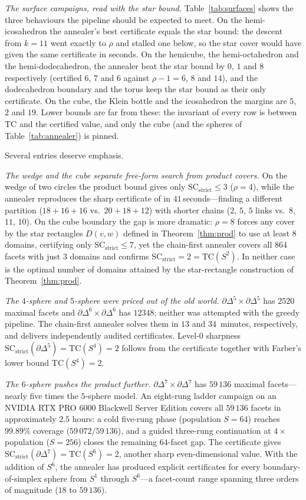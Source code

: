 \documentclass[12pt]{article}
\newcommand{\TC}{\mathrm{TC}}
\newcommand{\SC}{\mathrm{SC}}
\newcommand{\SCst}{\SC_{\mathrm{strict}}}
\begin{document}
\emph{The surface campaigns, read with the star bound.}  Table~\ref{tab:surfaces}
shows the three behaviours the pipeline should be expected to meet.  On
the hemi-icosahedron the annealer's best certificate equals the star
bound: the descent from $k=11$ went exactly to $\rho$ and stalled one
below, so the star cover would have given the same certificate in
seconds.  On the hemicube, the hemi-octahedron and the
hemi-dodecahedron, the annealer beat the star bound by $0$, $1$ and $8$
respectively (certified $6$, $7$ and $6$ against $\rho-1=6$, $8$ and
$14$), and the dodecahedron boundary and the torus keep the star bound as
their only certificate.  On the cube, the Klein bottle and the
icosahedron the margins are $5$, $2$ and $19$.  Lower bounds
are far from these: the invariant of every row is between $\TC$ and the
certified value, and only the cube (and the spheres of
Table~\ref{tab:annealer}) is pinned.

Several entries deserve emphasis.

\emph{The wedge and the cube separate free-form search from product
covers.}  On the wedge of two circles the product bound gives only
$\SCst\le 3$ ($\rho=4$), while the annealer reproduces the sharp
certificate of \cite{OLGB21} in $41$\,seconds---finding a different
partition ($18+16+16$ vs.\ $20+18+12$) with shorter chains ($2$, $5$,
$5$ links vs.\ $8$, $11$, $10$).  On the cube boundary the gap is
more dramatic: $\rho=8$ forces any cover by the star rectangles $D(v,w)$ defined in
Theorem~\ref{thm:prod} to use at least $8$ domains, certifying only $\SCst\le7$, yet the chain-first annealer
covers all $864$ facets with just $3$ domains and confirms
$\SCst=2=\TC(S^2)$.  In neither case is the optimal number of domains attained by the
star-rectangle construction of Theorem~\ref{thm:prod}.

\emph{The $4$-sphere and $5$-sphere were priced out of the old world.}
$\partial\Delta^5\times\partial\Delta^5$ has $2520$ maximal facets and
$\partial\Delta^6\times\partial\Delta^6$ has $12348$; neither was
attempted with the greedy pipeline.  The chain-first annealer solves
them in $13$ and $34$~minutes, respectively, and delivers independently
audited certificates.  Level-$0$ sharpness
$\SCst(\partial\Delta^5)=\TC(S^4)=2$ follows from the certificate
together with Farber's lower bound $\TC(S^4)=2$.

\emph{The $6$-sphere pushes the product further.}
$\partial\Delta^7\times\partial\Delta^7$ has $59\,136$ maximal
facets---nearly five times the $5$-sphere model.  An eight-rung ladder
campaign on an NVIDIA RTX PRO 6000 Blackwell Server Edition covers all
$59\,136$ facets in approximately $2.5$ hours: a cold five-rung phase
(population $S{=}64$) reaches $99.89\%$ coverage ($59\,072/59\,136$),
and a guided three-rung continuation at $4\times$ population ($S{=}256$)
closes the remaining $64$-facet gap.  The certificate gives
$\SCst(\partial\Delta^7)=\TC(S^6)=2$, another sharp even-dimensional
value.  With the addition of $S^6$, the annealer has produced explicit
certificates for every boundary-of-simplex sphere from $S^1$ through
$S^6$---a facet-count range spanning three orders of magnitude ($18$ to
$59\,136$).
\end{document}
